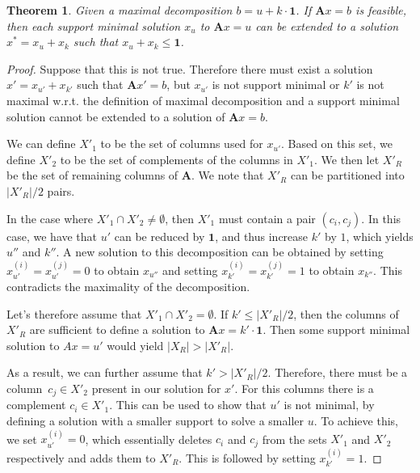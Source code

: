 \documentclass{article}
\newtheorem{theorem}{Theorem}
\begin{document}
\begin{adjustwidth}{10pt}{10pt}

\begin{theorem}
Given a  maximal decomposition $b = u + k\cdot \mathbf{1}$. If $\mathbf{A}x = b$ is feasible, then each support minimal solution $x_u$ to $\mathbf{A}x = u$ can be extended to a solution $x^* = x_u + x_k$ such that $x_u + x_k \leq \mathbf{1}$.
\end{theorem}
\begin{proof}
Suppose that this is not true. Therefore there must exist a solution $x' = x_{u'} + x_{k'}$ such that $\mathbf{A}x' = b$, but $x_{u'}$ is not support minimal or $k'$ is not maximal w.r.t. the definition of maximal decomposition and a support minimal solution cannot be extended to a solution of $\mathbf{A}x = b$. 

We can define $X'_1$ to be the set of columns used for $x_{u'}$. Based on this set, we define $X'_2$ to be the set of complements of the columns in $X'_1$. We then let $X'_R$ be the set of remaining columns of $\mathbf{A}$. We note that $X'_R$ can be partitioned into  $\left|X'_R\right|/2$ pairs.

In the case where $X'_1 \cap X'_2 \ne \emptyset$, then $X'_1$ must contain a pair $(c_i, c_j)$. In this case, we have that $u'$ can be reduced by $\mathbf{1}$, and thus increase $k'$ by $1$, which yields $u''$ and $k''$. A new solution to this decomposition can be obtained by setting $x_{u'}^{(i)} = x_{u'}^{(j)} = 0$ to obtain $x_{u''}$ and setting $x_{k'}^{(i)} = x_{k'}^{(j)} = 1$ to obtain $x_{k''}$. This contradicts the maximality of the decomposition.

Let's therefore assume that $X'_1 \cap X'_2 = \emptyset$. If $k' \leq \left|X'_R\right|/2$, then the columns of $X'_R$ are sufficient to define a solution to $\mathbf{A}x = k'\cdot \mathbf{1}$. Then some support minimal solution to $Ax = u'$ would yield $\left|X_R\right|>\left|X'_R\right|$. 

As a result, we can further assume that $k' > \left|X'_R\right|/2$. Therefore, there must be a column~$c_j \in X'_2$ present in our solution for $x'$. For this columns there is a complement $c_i \in X'_1$. This can be used to show that $u'$ is not minimal, by defining a solution with a smaller support to solve a smaller $u$. To achieve this, we set $x_{u'}^{(i)} = 0$, which essentially deletes $c_i$ and $c_j$ from the sets $X'_1$ and $X'_2$ respectively and adds them to $X'_R$. This is followed by setting $x_{k'}^{(i)} = 1$.


\end{proof}
\end{adjustwidth}
\end{document}
